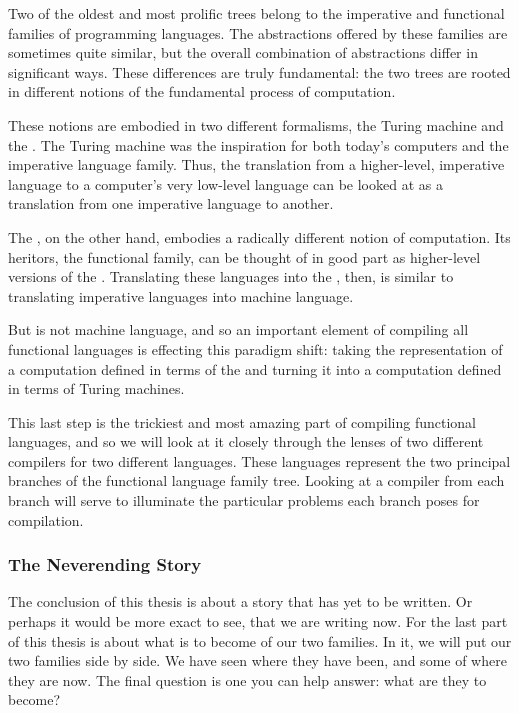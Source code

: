 Two of the oldest and most prolific trees belong to the imperative and functional families of programming languages. The abstractions offered by these families are sometimes quite similar, but the overall combination of abstractions differ in significant ways. These differences are truly fundamental: the two trees are rooted in different notions of the fundamental process of computation.

These notions are embodied in two different formalisms, the Turing machine and the \lambdacalc{}. The Turing machine was the inspiration for both today's computers and the imperative language family. Thus, the translation from a higher-level, imperative language to a computer's very low-level language can be looked at as a translation from one imperative language to another.

The \lambdacalc{}, on the other hand, embodies a radically different notion of computation. Its heritors, the functional family, can be thought of in good part as higher-level versions of the \lambdacalc{}. Translating these languages into the \lambdacalc{}, then, is similar to translating imperative languages into machine language.

But \lambdacalc is not machine language, and so an important element of compiling all functional languages is effecting this paradigm shift: taking the representation of a computation defined in terms of the \lambdacalc and turning it into a computation defined in terms of Turing machines.

This last step is the trickiest and most amazing part of compiling functional languages, and so we will look at it closely through the lenses of two different compilers for two different languages. These languages represent the two principal branches of the functional language family tree. Looking at a compiler from each branch will serve to illuminate the particular problems each branch poses for compilation.

\subsubsection*{The Neverending Story}%
The conclusion of this thesis is about a story that has yet to be written. Or perhaps it would be more exact to see, that we are writing now. For the last part of this thesis is about what is to become of our two families. In it, we will put our two families side by side. We have seen where they have been, and some of where they are now. The final question is one you can help answer: what are they to become?

    \clearscrheadings
    \setheadsepline{0pt}
        {\relax}%
        {\renewcommand{\chaptermark}[1]{\markboth{\spacedlowsmallcaps{#1}}{}}}
    \renewcommand{\sectionmark}[1]{\markright{\thesection\ \spacedlowsmallcaps{#1}}}
    \lehead{\mbox{\llap{\small\thepage\kern2em}\headmark\hfil}}
    \rohead{\mbox{\hfil{\headmark}\rlap{\small\kern2em\thepage}}}
    \renewcommand{\headfont}{\small}  
